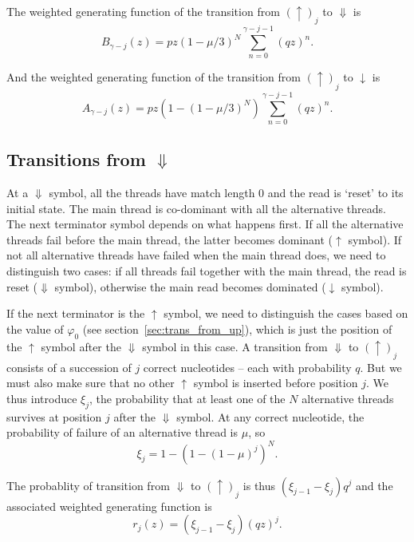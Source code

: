 \documentclass{article}
\begin{document}
The weighted generating function of the transition from $(\uparrow)_j$ to
$\Downarrow$ is
\begin{equation}
B_{\gamma-j}(z) = pz (1-\mu/3)^N \sum_{n=0}^{\gamma-j-1} (qz)^n.
\end{equation}

And the weighted generating function of the transition from
$(\uparrow)_j$ to $\downarrow$ is
\begin{equation}
A_{\gamma-j}(z) = pz (1-(1-\mu/3)^N) \sum_{n=0}^{\gamma-j-1} (qz)^n.
\end{equation}



\subsection{Transitions from $\Downarrow$}
\label{sec:trans_from_Down}

At a $\Downarrow$ symbol, all the threads have match length $0$ and the
read is `reset' to its initial state. The main thread is co-dominant with
all the alternative threads. The next terminator symbol depends on what
happens first. If all the alternative threads fail before the main thread,
the latter becomes dominant ($\uparrow$ symbol). If not all alternative
threads have failed when the main thread does, we need to distinguish two
cases: if all threads fail together with the main thread, the read is
reset ($\Downarrow$ symbol), otherwise the main read becomes dominated
($\downarrow$ symbol).

If the next terminator is the $\uparrow$ symbol, we need to distinguish
the cases based on the value of $\varphi_0$ (see
section~\ref{sec:trans_from_up}), which is just the position of
the $\uparrow$ symbol after the $\Downarrow$ symbol in this case. A
transition from $\Downarrow$ to $(\uparrow)_j$ consists of a succession of
$j$ correct nucleotides -- each with probability $q$. But we must also
make sure that no other $\uparrow$ symbol is inserted before position $j$.
We thus introduce $\xi_j$, the probability that at least one of the $N$
alternative threads survives at position $j$ after the $\Downarrow$ symbol. At
any correct nucleotide, the probability of failure of an alternative thread is
$\mu$, so
\begin{equation}
\xi_j = 1-(1-(1-\mu)^j)^N.
\end{equation}

The probablity of transition from $\Downarrow$ to $(\uparrow)_j$ is thus
$(\xi_{j-1}-\xi_j)q^j$ and the associated weighted generating function is
\begin{equation}
r_j(z) = (\xi_{j-1}-\xi_j)(qz)^j.
\end{equation}
\end{document}
